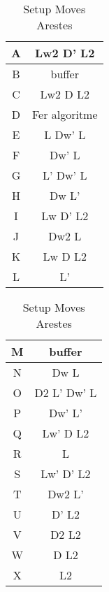 \begin{table}[h]
    \begin{minipage}{.5\linewidth}
        \centering
        \begin{tabular}{|c|c|}
            \hline
            A & Lw2 D' L2     \\ 
            \hline
            B & buffer        \\ 
            \hline
            C & Lw2 D L2      \\
            \hline
            D & Fer algoritme \\ 
            \hline
            E & L Dw' L       \\ 
            \hline
            F & Dw' L         \\ 
            \hline
            G & L' Dw' L      \\ 
            \hline
            H & Dw L'         \\ 
            \hline
            I & Lw D' L2      \\ 
            \hline
            J & Dw2 L         \\ 
            \hline
            K & Lw D L2       \\ 
            \hline
            L & L'            \\ 
            \hline
        \end{tabular}
    \end{minipage}
    \begin{minipage}{.5\linewidth}
        \centering
        \begin{tabular}{|c|c|}
            \hline
            M & buffer        \\ 
            \hline
            N & Dw L          \\ 
            \hline
            O & D2 L' Dw' L   \\ 
            \hline
            P & Dw' L'        \\ 
            \hline
            Q & Lw' D L2      \\ 
            \hline
            R & L             \\ 
            \hline
            S & Lw' D' L2     \\ 
            \hline
            T & Dw2 L'        \\ 
            \hline
            U & D' L2         \\ 
            \hline
            V & D2 L2         \\ 
            \hline
            W & D L2          \\ 
            \hline
            X & L2            \\ 
            \hline
        \end{tabular}
    \end{minipage} 
    \caption{Setup Moves Arestes}
    \label{fig:setup-arestes}
\end{table}


